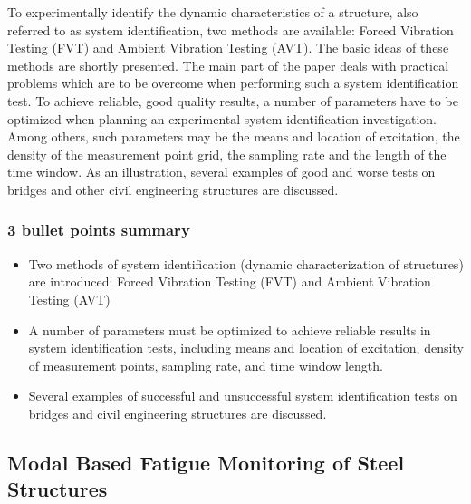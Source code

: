 \documentclass[
  letterpaper,
  DIV=11,
  numbers=noendperiod]{scrreprt}
\providecommand{\tightlist}{%
  \setlength{\itemsep}{0pt}\setlength{\parskip}{0pt}}\usepackage{longtable,booktabs,array}
\begin{document}
To experimentally identify the dynamic characteristics of a structure,
also referred to as system identification, two methods are available:
Forced Vibration Testing (FVT) and Ambient Vibration Testing (AVT). The
basic ideas of these methods are shortly presented. The main part of the
paper deals with practical problems which are to be overcome when
performing such a system identification test. To achieve reliable, good
quality results, a number of parameters have to be optimized when
planning an experimental system identification investigation. Among
others, such parameters may be the means and location of excitation, the
density of the measurement point grid, the sampling rate and the length
of the time window. As an illustration, several examples of good and
worse tests on bridges and other civil engineering structures are
discussed.

\hypertarget{bullet-points-summary-15}{%
\subsubsection{3 bullet points summary}\label{bullet-points-summary-15}}

\begin{itemize}
\tightlist
\item
  Two methods of system identification (dynamic characterization of
  structures) are introduced: Forced Vibration Testing (FVT) and Ambient
  Vibration Testing (AVT)
\item
  A number of parameters must be optimized to achieve reliable results
  in system identification tests, including means and location of
  excitation, density of measurement points, sampling rate, and time
  window length.
\item
  Several examples of successful and unsuccessful system identification
  tests on bridges and civil engineering structures are discussed.
\end{itemize}

\hypertarget{modal-based-fatigue-monitoring-of-steel-structures}{%
\subsection{Modal Based Fatigue Monitoring of Steel
Structures}\label{modal-based-fatigue-monitoring-of-steel-structures}}
\end{document}
